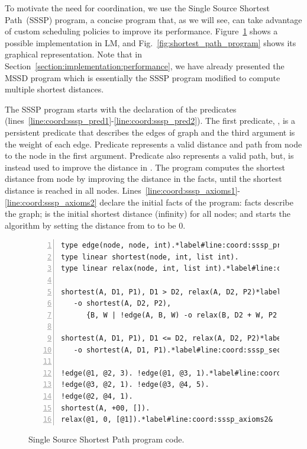 To motivate the need for coordination, we use the Single Source Shortest
Path~(SSSP) program, a concise program that, as we will see, can take advantage
of custom scheduling policies to improve its performance.
Figure~\ref{code:shortest_path_program} shows a possible implementation in LM,
and Fig.~\ref{fig:shortest_path_program} shows its graphical representation.
Note that in Section~\ref{section:implementation:performance}, we have already
presented the MSSD program which is essentially the SSSP program modified to compute
multiple shortest distances.

The SSSP program starts with the declaration of the predicates~
(lines~\ref{line:coord:sssp_pred1}-\ref{line:coord:sssp_pred2}). The first
predicate, , is a persistent predicate that describes the edges of
graph and the third argument is the weight of each edge. Predicate
 represents a valid distance and path from node  to the
node in the first argument. Predicate  also represents a valid path,
but, is instead used to improve the distance in .  The program
computes the shortest distance from node  by improving the distance in
the  facts, until the shortest distance is reached in all nodes.
Lines~\ref{line:coord:sssp_axioms1}-\ref{line:coord:sssp_axioms2} declare the
initial facts of the program:  facts describe the graph;
 is the initial shortest distance (infinity) for all
nodes; and  starts the algorithm by setting the
distance from  to  to be 0.

\begin{figure}[ht]
\begin{Verbatim}[numbers=left,fontsize=\codesize,commandchars=\*\#\&]
type edge(node, node, int).*label#line:coord:sssp_pred1&*hfill// Predicate declaration
type linear shortest(node, int, list int).
type linear relax(node, int, list int).*label#line:coord:sssp_pred2&

shortest(A, D1, P1), D1 > D2, relax(A, D2, P2)*label#line:coord:sssp_first1&*hfill// Rule 1: newly improved path
   -o shortest(A, D2, P2),
      {B, W | !edge(A, B, W) -o relax(B, D2 + W, P2 ++ [B])}.*label#line:coord:sssp_first2&

shortest(A, D1, P1), D1 <= D2, relax(A, D2, P2)*label#line:coord:sssp_second1&*hfill// Rule 2: longer path
   -o shortest(A, D1, P1).*label#line:coord:sssp_second2&

!edge(@1, @2, 3). !edge(@1, @3, 1).*label#line:coord:sssp_axioms1&*hfill// Initial facts
!edge(@3, @2, 1). !edge(@3, @4, 5).
!edge(@2, @4, 1).
shortest(A, +00, []).
relax(@1, 0, [@1]).*label#line:coord:sssp_axioms2&
\end{Verbatim}
\caption{Single Source Shortest Path program code.}
\label{code:shortest_path_program}
\end{figure}

